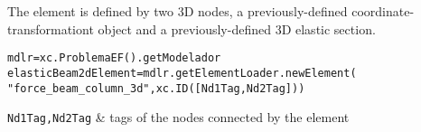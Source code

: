 The element is defined by two 3D nodes, a previously-defined coordinate-transformationt object and a previously-defined 3D elastic section.
\begin{verbatim}
mdlr=xc.ProblemaEF().getModelador
elasticBeam2dElement=mdlr.getElementLoader.newElement(
"force_beam_column_3d",xc.ID([Nd1Tag,Nd2Tag]))
\end{verbatim}
\begin{paramFuncTable}
{\tt Nd1Tag,Nd2Tag} & tags of the nodes connected by the element\\
\end{paramFuncTable}
\begin{paramClassTable}
\ElementParam{}
\ElementOneDParam{}
\rhoX{}
\end{paramClassTable}

\begin{methodsTable}
\ElementMeth{}
\ElementOneDMeth{}
\BeamColumnWithSectionFDMeth{}
\getVDirEjeFuerteLocales{} \\
\getVDirEjeDebilLocales{} \\
\getAnguloEjeFuerte{} \\
\getAnguloEjeDebil{} \\
\getVDirEjeFuerteGlobales{} \\
\getVDirEjeDebilGlobales{} \\
\end{methodsTable}
